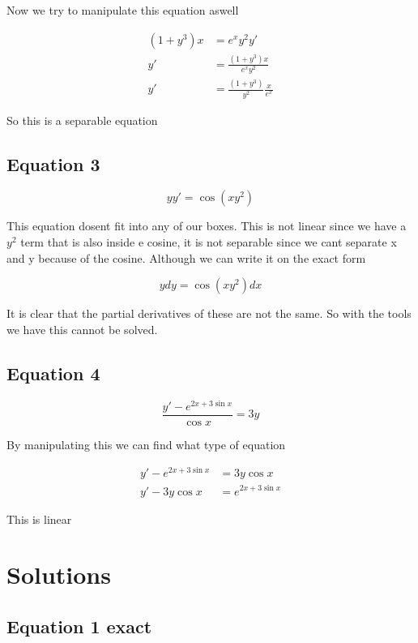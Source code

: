 \documentclass[a4paper]{article}
\begin{document}
Now we try to manipulate this equation aswell

\begin{align}
    (1+y^3)x &= e^x y^2 y'\\
    y' &= \frac{(1+y^3)x}{e^x y^2}\\
    y' &= \frac{(1+y^3)}{y^2}\frac{x}{e^x}
\end{align}

So this is a separable equation

\subsection{Equation 3}

\begin{equation}
    yy' = \cos(xy^2)
\end{equation}

This equation dosent fit into any of our boxes. This is not linear since we have a $y^2$ term that is also inside e cosine, it is not separable since we cant separate  x and y because of the cosine. Although we can write it on the exact form

\begin{equation}
    y dy = \cos(xy^2) dx
\end{equation}

It is clear that the partial derivatives of these are not the same. So with the tools we have this cannot be solved.

\subsection{Equation 4}

\begin{equation}
    \frac{y' - e^{2x+3\sin x}}{\cos x} = 3y
\end{equation}

By manipulating this we can find what type of equation

\begin{align}
    y' - e^{2x+3\sin x} &= 3y \cos x \\
    y' - 3y \cos x &= e^{2x+3\sin x}
\end{align}

This is linear


\section{Solutions}

\subsection{Equation 1 exact}
\end{document}
